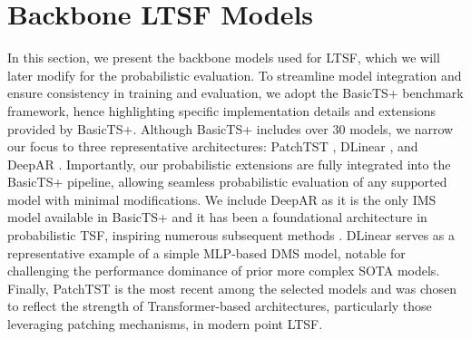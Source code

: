 \documentclass[a4paper,oneside,bibliography=totoc]{scrbook}
\begin{document}
\section{Backbone LTSF Models}
\label{sec:backbones}
In this section, we present the backbone models used for LTSF, which we will later modify for the probabilistic evaluation. 
To streamline model integration and ensure consistency in training and evaluation, we adopt the BasicTS+ \cite{shao_exploring_2025} benchmark framework, hence highlighting specific implementation details and extensions provided by BasicTS+.
Although BasicTS+ includes over 30 models, we narrow our focus to three representative architectures: PatchTST \cite{nie_time_2022}, DLinear \cite{zeng_are_2023}, and DeepAR \cite{salinas_deepar_2020}. 
Importantly, our probabilistic extensions are fully integrated into the BasicTS+ pipeline, allowing seamless probabilistic evaluation of any supported model with minimal modifications.
We include DeepAR as it is the only IMS model available in BasicTS+ and it has been a foundational architecture in probabilistic TSF, inspiring numerous subsequent methods \cite{rasul_vq-ar_2022, rasul_autoregressive_2021, rasul_multivariate_2020, bergsma_c2far_2022, kan_multivariate_2022}.
DLinear serves as a representative example of a simple MLP-based DMS model, notable for challenging the performance dominance of prior more complex SOTA models.
Finally, PatchTST is the most recent among the selected models and was chosen to reflect the strength of Transformer-based architectures, particularly those leveraging patching mechanisms, in modern point LTSF.
\end{document}
